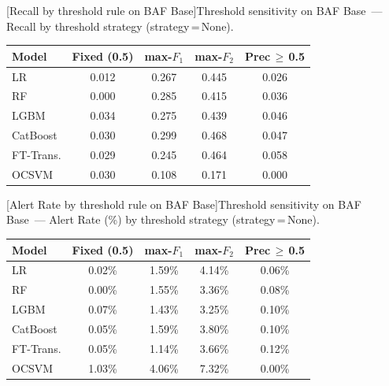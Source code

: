\noindent\begin{minipage}{\linewidth}\centering
{}[Recall by threshold rule on BAF Base]{Threshold sensitivity on BAF Base~--- Recall by threshold strategy (strategy\,=\,None).}
\label{tab:threshold_baf_recall}
\begin{tabular}{l c c c c}
\toprule
Model & Fixed (0.5) & max-$F_1$ & max-$F_2$ & Prec\,$\geq$\,0.5 \\
\midrule
LR         & 0.012 & 0.267 & 0.445 & 0.026 \\
RF         & 0.000 & 0.285 & 0.415 & 0.036 \\
LGBM       & 0.034 & 0.275 & 0.439 & 0.046 \\
CatBoost   & 0.030 & 0.299 & 0.468 & 0.047 \\
FT-Trans.  & 0.029 & 0.245 & 0.464 & 0.058 \\
OCSVM      & 0.030 & 0.108 & 0.171 & 0.000 \\
\bottomrule
\end{tabular}
\end{minipage}

\noindent\begin{minipage}{\linewidth}\centering
{}[Alert Rate by threshold rule on BAF Base]{Threshold sensitivity on BAF Base~--- Alert Rate (\%) by threshold strategy (strategy\,=\,None).}
\label{tab:threshold_baf_alert}
\begin{tabular}{l c c c c}
\toprule
Model & Fixed (0.5) & max-$F_1$ & max-$F_2$ & Prec\,$\geq$\,0.5 \\
\midrule
LR         & 0.02\% & 1.59\% & 4.14\% & 0.06\% \\
RF         & 0.00\% & 1.55\% & 3.36\% & 0.08\% \\
LGBM       & 0.07\% & 1.43\% & 3.25\% & 0.10\% \\
CatBoost   & 0.05\% & 1.59\% & 3.80\% & 0.10\% \\
FT-Trans.  & 0.05\% & 1.14\% & 3.66\% & 0.12\% \\
OCSVM      & 1.03\% & 4.06\% & 7.32\% & 0.00\% \\
\bottomrule
\end{tabular}
\end{minipage}

